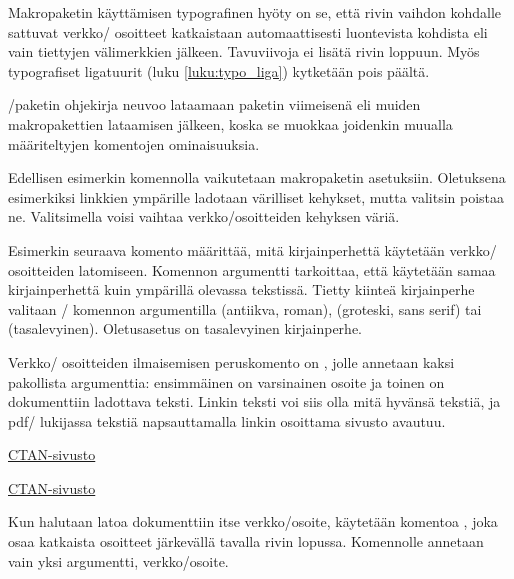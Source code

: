 Makropaketin käyttämisen typografinen hyöty on se, että rivin vaihdon
kohdalle sattuvat verkko\-/ osoitteet katkaistaan automaattisesti
luontevista kohdista eli vain tiettyjen välimerkkien jälkeen.
Tavuviivoja ei lisätä rivin loppuun. Myös typografiset ligatuurit (luku
\ref{luku:typo_liga}) kytketään pois päältä.

\-/paketin ohjekirja neuvoo lataamaan paketin
viimeisenä eli muiden makropakettien lataamisen jälkeen, koska se
muokkaa joidenkin muualla määriteltyjen komentojen ominaisuuksia.

\begin{koodilohkosis}
\usepackage{hyperref}  %
\hypersetup{hidelinks} %
\end{koodilohkosis}

Edellisen esimerkin komennolla  vaikutetaan
makropaketin asetuksiin. Oletuksena esimerkiksi linkkien ympärille
ladotaan värilliset kehykset, mutta valitsin  poistaa
ne. Valitsimella  voisi vaihtaa verkko\-/osoitteiden
kehyksen väriä.

Esimerkin seuraava komento  määrittää, mitä
kirjainperhettä käytetään verkko\-/ osoitteiden latomiseen. Komennon
argumentti  tarkoittaa, että käytetään samaa kirjainperhettä
kuin ympärillä olevassa tekstissä. Tietty kiinteä kirjainperhe valitaan
\-/ komennon argumentilla  (antiikva,
roman),  (groteski, sans serif) tai  (tasalevyinen).
Oletusasetus on tasalevyinen kirjainperhe.

Verkko\-/ osoitteiden ilmaisemisen peruskomento on ,
jolle annetaan kaksi pakollista argumenttia: ensimmäinen on varsinainen
osoite ja toinen on dokumenttiin ladottava teksti. Linkin teksti voi
siis olla mitä hyvänsä tekstiä, ja pdf\-/ lukijassa tekstiä
napsauttamalla linkin osoittama sivusto avautuu.

\begin{koodilohkosis}
\href{https://www.ctan.org/}{CTAN-sivusto}
\end{koodilohkosis}

\begin{tulossis}
  \href{https://www.ctan.org/}{CTAN-sivusto}
\end{tulossis}

Kun halutaan latoa dokumenttiin itse verkko\-/osoite, käytetään komentoa
,  joka osaa katkaista osoitteet
järkevällä tavalla rivin lopussa. Komennolle annetaan vain yksi
argumentti, verkko\-/osoite.


